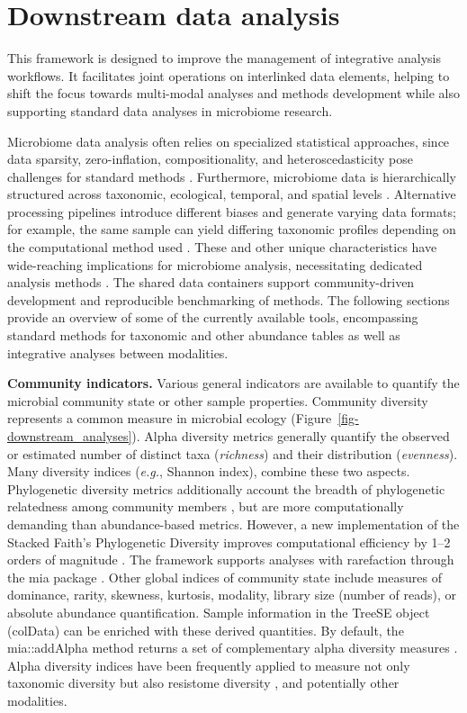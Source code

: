 \documentclass[
  sn-nature,
]{sn-jnl}
\begin{document}
\label{fig:workflow}

\section{Downstream data analysis}\label{sec-analysis}

This framework is designed to improve the management of integrative
analysis workflows. It facilitates joint operations on interlinked data
elements, helping to shift the focus towards multi-modal analyses and
methods development while also supporting standard data analyses in
microbiome research.

Microbiome data analysis often relies on specialized statistical
approaches, since data sparsity, zero-inflation, compositionality, and
heteroscedasticity pose challenges for standard methods
\citep{gloor2017, jeganathan2021}. Furthermore, microbiome data is
hierarchically structured across taxonomic, ecological, temporal, and
spatial levels \citep{moreno-indias2021, ruuskanen2021}. Alternative
processing pipelines introduce different biases and generate varying
data formats; for example, the same sample can yield differing taxonomic
profiles depending on the computational method used \citep{quince2017}.
These and other unique characteristics have wide-reaching implications
for microbiome analysis, necessitating dedicated analysis methods
\citep{moreno-indias2021}. The shared data containers support
community-driven development and reproducible benchmarking of methods.
The following sections provide an overview of some of the currently
available tools, encompassing standard methods for taxonomic and other
abundance tables as well as integrative analyses between modalities.

\textbf{Community indicators.} Various general indicators are available
to quantify the microbial community state or other sample properties.
Community diversity represents a common measure in microbial ecology
\citep{bastiaanssen_bugs1_2023} (Figure~\ref{fig-downstream_analyses}).
Alpha diversity metrics generally quantify the observed or estimated
number of distinct taxa (\emph{richness}) and their distribution
(\emph{evenness}). Many diversity indices (\emph{e.g.}, Shannon index),
combine these two aspects. Phylogenetic diversity metrics additionally
account the breadth of phylogenetic relatedness among community members
\citep{faith1992}, but are more computationally demanding than
abundance-based metrics. However, a new implementation of the Stacked
Faith's Phylogenetic Diversity improves computational efficiency by 1--2
orders of magnitude \citep{armstrong2021}. The framework supports
analyses with rarefaction through the mia package \citep{schloss2024b}.
Other global indices of community state include measures of dominance,
rarity, skewness, kurtosis, modality, library size (number of reads), or
absolute abundance quantification. Sample information in the TreeSE
object (colData) can be enriched with these derived quantities. By
default, the mia::addAlpha method returns a set of complementary alpha
diversity measures \citep{cassol2025}. Alpha diversity indices have been
frequently applied to measure not only taxonomic diversity but also
resistome diversity \citep{salehi2025}, and potentially other
modalities.
\end{document}
